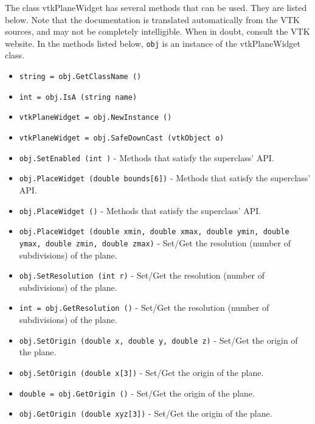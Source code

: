 The class vtkPlaneWidget has several methods that can be used.
  They are listed below.
Note that the documentation is translated automatically from the VTK sources,
and may not be completely intelligible.  When in doubt, consult the VTK website.
In the methods listed below, \verb|obj| is an instance of the vtkPlaneWidget class.
\begin{itemize}
\item  \verb|string = obj.GetClassName ()|

\item  \verb|int = obj.IsA (string name)|

\item  \verb|vtkPlaneWidget = obj.NewInstance ()|

\item  \verb|vtkPlaneWidget = obj.SafeDownCast (vtkObject o)|

\item  \verb|obj.SetEnabled (int )| -  Methods that satisfy the superclass' API.

\item  \verb|obj.PlaceWidget (double bounds[6])| -  Methods that satisfy the superclass' API.

\item  \verb|obj.PlaceWidget ()| -  Methods that satisfy the superclass' API.

\item  \verb|obj.PlaceWidget (double xmin, double xmax, double ymin, double ymax, double zmin, double zmax)| -  Set/Get the resolution (number of subdivisions) of the plane.

\item  \verb|obj.SetResolution (int r)| -  Set/Get the resolution (number of subdivisions) of the plane.

\item  \verb|int = obj.GetResolution ()| -  Set/Get the resolution (number of subdivisions) of the plane.

\item  \verb|obj.SetOrigin (double x, double y, double z)| -  Set/Get the origin of the plane.

\item  \verb|obj.SetOrigin (double x[3])| -  Set/Get the origin of the plane.

\item  \verb|double = obj.GetOrigin ()| -  Set/Get the origin of the plane.

\item  \verb|obj.GetOrigin (double xyz[3])| -  Set/Get the origin of the plane.


\end{itemize}
